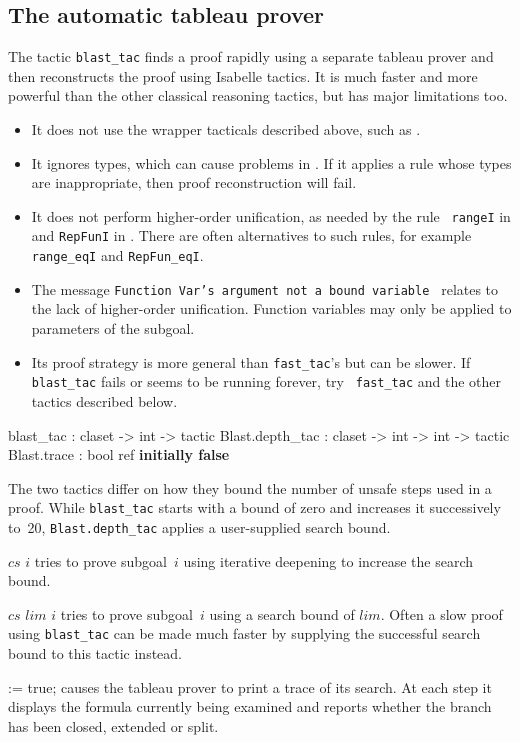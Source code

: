\subsection{The automatic tableau prover}
The tactic {\tt blast_tac} finds a proof rapidly using a separate tableau
prover and then reconstructs the proof using Isabelle tactics.  It is much
faster and more powerful than the other classical reasoning tactics, but has
major limitations too.  
\begin{itemize}
\item It does not use the wrapper tacticals described above, such as
  .
\item It ignores types, which can cause problems in \HOL.  If it applies a rule
  whose types are inappropriate, then proof reconstruction will fail.
\item It does not perform higher-order unification, as needed by the rule {\tt
    rangeI} in {\HOL} and {\tt RepFunI} in {\ZF}.  There are often
    alternatives to such rules, for example {\tt
    range_eqI} and {\tt RepFun_eqI}.
\item The message {\small\tt Function Var's argument not a bound variable\ }
relates to the lack of higher-order unification.  Function variables
may only be applied to parameters of the subgoal.
\item Its proof strategy is more general than {\tt fast_tac}'s but can be
  slower.  If {\tt blast_tac} fails or seems to be running forever, try {\tt
  fast_tac} and the other tactics described below.
\end{itemize}
%
\begin{ttbox} 
blast_tac        : claset -> int -> tactic
Blast.depth_tac  : claset -> int -> int -> tactic
Blast.trace      : bool ref \hfill{\bf initially false}
\end{ttbox}
The two tactics differ on how they bound the number of unsafe steps used in a
proof.  While {\tt blast_tac} starts with a bound of zero and increases it
successively to~20, {\tt Blast.depth_tac} applies a user-supplied search bound.
\begin{ttdescription}
\item[\ttindexbold{blast_tac} $cs$ $i$] tries to prove
  subgoal~$i$ using iterative deepening to increase the search bound.
  
\item[\ttindexbold{Blast.depth_tac} $cs$ $lim$ $i$] tries
  to prove subgoal~$i$ using a search bound of $lim$.  Often a slow
  proof using {\tt blast_tac} can be made much faster by supplying the
  successful search bound to this tactic instead.
  
\item[\ttindexbold{Blast.trace} := true;] 
  causes the tableau prover to print a trace of its search.  At each step it
  displays the formula currently being examined and reports whether the branch
  has been closed, extended or split.
\end{ttdescription}

